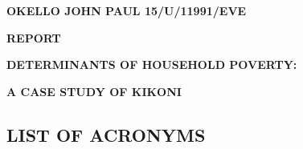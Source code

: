 \documentclass[12pt]{article}
\author{user}
\title{}
\begin{document}
\begin{center}
\textbf{{\Large OKELLO JOHN PAUL                                
15/U/11991/EVE}}
\end{center}

\begin{center}
\textbf{{\large REPORT}}
\end{center}

\begin{center}
\textbf{{\large DETERMINANTS OF HOUSEHOLD POVERTY:}}
\end{center}

\begin{center}
\textbf{{\large  A CASE STUDY OF KIKONI}}
\end{center}

\begin{center}
\section{LIST OF ACRONYMS}
\end{center}
\end{document}
